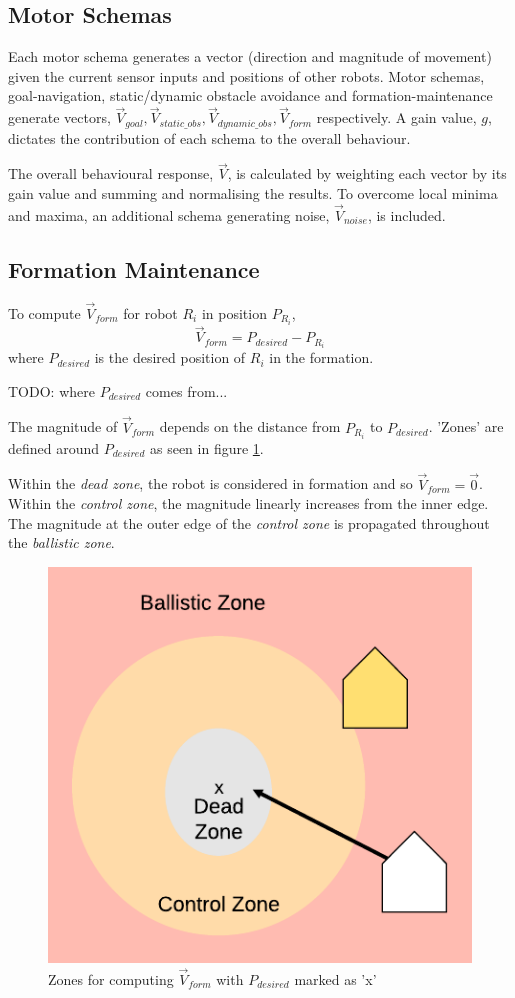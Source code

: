 \documentclass[letterpaper, 10 pt, conference]{ieeeconf}  %
\begin{document}
\subsection{Motor Schemas}

Each motor schema generates a vector (direction and magnitude of movement) given the current sensor inputs and positions of other robots. Motor schemas, goal-navigation, static/dynamic obstacle avoidance and formation-maintenance generate vectors, $\vec{V}_{goal}, \vec{V}_{static\_obs}, \vec{V}_{dynamic\_obs}, \vec{V}_{form}$ respectively. A gain value, $g$, dictates the contribution of each schema to the overall behaviour. 

The overall behavioural response, $\vec{V}$, is calculated by weighting each vector by its gain value and summing and normalising the results. To overcome local minima and maxima, an additional schema generating noise, $\vec{V}_{noise}$, is included.

\subsection{Formation Maintenance}

To compute $\vec{V}_{form}$ for robot $R_i$ in position $P_{R_i}$,
\[\vec{V}_{form} = P_{desired} - P_{R_i}\]
where $P_{desired}$ is the desired position of $R_i$ in the formation.

TODO: where $P_{desired}$ comes from...

The magnitude of $\vec{V}_{form}$ depends on the distance from $P_{R_i}$ to $P_{desired}$. 'Zones' are defined around $P_{desired}$ as seen in figure \ref{formation_zones}. 

Within the \textit{dead zone}, the robot is considered in formation and so $\vec{V}_{form} = \vec{0}$. Within the \textit{control zone}, the magnitude linearly increases from the inner edge. The magnitude at the outer edge of the \textit{control zone} is propagated throughout the \textit{ballistic zone}.

\begin{figure}[ht]
\centering
\includegraphics[width=0.45\linewidth]{images/formation_zones.png}
\caption{Zones for computing $\vec{V}_{form}$ with $P_{desired}$ marked as 'x'}
\label{formation_zones}
\end{figure}
\end{document}
